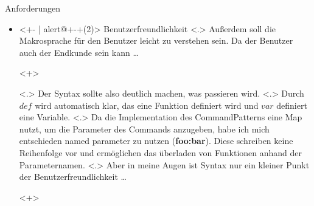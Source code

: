 \begin{frame}{Anforderungen}
\begin{itemize}
{              Ein Beispiel wäre \ldots
            }
        \begin{uncoverenv}<+-+>
          \tabto{4.6cm}
          \myMIn$if(has_unsaved()) \{ save(); \}$\hspace*{-4cm} %
        \end{uncoverenv}
            \note[item]<.>{
              Das ein Makro nur probiert zu speichern, wenn es etwas zum speichern gibt.
            }
            \note[item]<.>{
              Generell sollte speichern schnell gehen, allerdings kann es passieren, dass eine mehrere Gigabyte große Datei geschrieben werden muss, was dem Nutzer nicht zumuten ist.
            }
      \item<+- | alert@+-+(2)>
        Benutzerfreundlichkeit
            \note[item]<.>{
              Außerdem soll die Makrosprache für den Benutzer leicht zu verstehen sein. Da der Benutzer auch der Endkunde sein kann \ldots
            }
        \begin{uncoverenv}<+>
        \end{uncoverenv}
            \note[item]<.>{
              Der Syntax sollte also deutlich machen, was passieren wird.
            }
            \note[item]<.>{
              Durch \myMIn$def$ wird automatisch klar, das eine Funktion definiert wird und \myMIn$var$ definiert eine Variable.
            }
            \note[item]<.>{
              Da die Implementation des CommandPatterns eine Map nutzt, um die Parameter des Commands anzugeben, habe ich mich entschieden named parameter zu nutzen (\textbf{foo:bar}). Diese schreiben keine Reihenfolge vor und ermöglichen das überladen von Funktionen anhand der Parameternamen.
            }
            \note[item]<.>{
              Aber in meine Augen ist Syntax nur ein kleiner Punkt der Benutzerfreundlichkeit \ldots
            }
        \begin{uncoverenv}<+>
\end{uncoverenv}
\end{itemize}
\end{frame}
